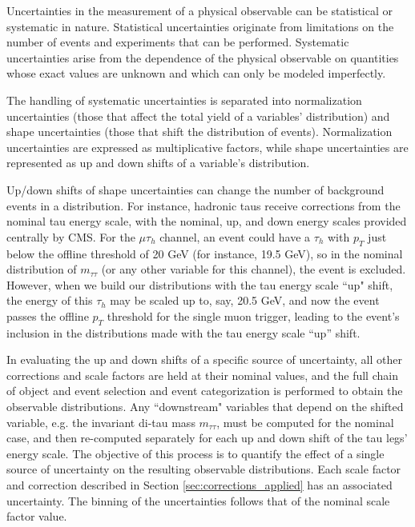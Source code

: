 Uncertainties in the measurement of a physical observable can be statistical or systematic in nature. Statistical uncertainties originate from limitations on the number of events and experiments that can be performed. Systematic uncertainties arise from the dependence of the physical observable on quantities whose exact values are unknown and which can only be modeled imperfectly.

The handling of systematic uncertainties is separated into normalization uncertainties (those that affect the total yield of a variables' distribution) and shape uncertainties (those that shift the distribution of events). Normalization uncertainties are expressed as multiplicative factors, while shape uncertainties are represented as up and down shifts of a variable's distribution.

Up/down shifts of shape uncertainties can change the number of background events in a distribution. For instance, hadronic taus receive corrections from the nominal tau energy scale, with the nominal, up, and down energy scales provided centrally by CMS. For the $\mu\tau_{h}$ channel, an event could have a $\tau_{h}$ with $p_{T}$ just below the offline threshold of 20 GeV (for instance, 19.5 GeV), so in the nominal distribution of $m_{\tau\tau}$ (or any other variable for this channel), the event is excluded. However, when we build our distributions with the tau energy scale ``up" shift, the energy of this $\tau_{h}$ may be scaled up to, say, 20.5 GeV, and now the event passes the offline $p_{T}$ threshold for the single muon trigger, leading to the event's inclusion in the distributions made with the tau energy scale ``up'' shift.

In evaluating the up and down shifts of a specific source of uncertainty, all other corrections and scale factors are held at their nominal values, and the full chain of object and event selection and event categorization is performed to obtain the observable distributions. Any ``downstream" variables that depend on the shifted variable, e.g. the invariant di-tau mass $m_{\tau\tau}$, must be computed for the nominal case, and then re-computed separately for each up and down shift of the tau legs' energy scale.  The objective of this process is to quantify the effect of a single source of uncertainty on the resulting observable distributions. Each scale factor and correction described in Section \ref{sec:corrections_applied} has an associated uncertainty. The binning of the uncertainties follows that of the nominal scale factor value.

